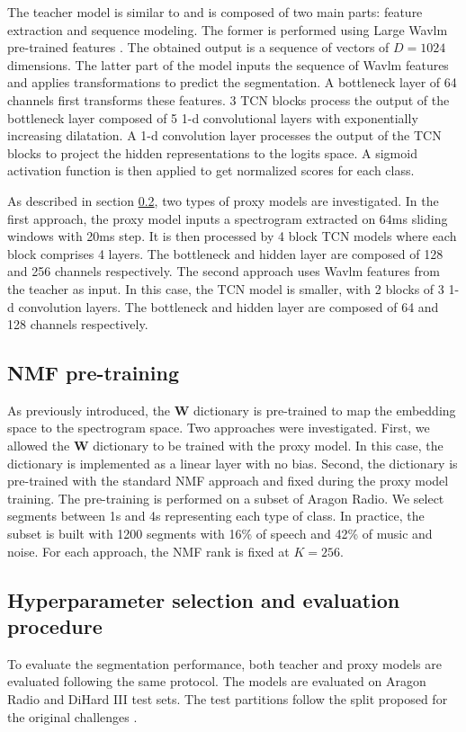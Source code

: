 The teacher model is similar to \cite{lebourdais22_interspeech} and is composed of two main parts: feature extraction and sequence modeling.
The former is performed using Large Wavlm pre-trained features \cite{chen2022wavlm}.
The obtained output is a sequence of vectors of $D=1024$ dimensions.
The latter part of the model inputs the sequence of Wavlm features and applies transformations to predict the segmentation.
A bottleneck layer of 64 channels first transforms these features.
3 TCN blocks process the output of the bottleneck layer \cite{bai_empirical_2018} composed of 5 1-d convolutional layers with exponentially increasing dilatation. 
A 1-d convolution layer processes the output of the TCN blocks to project the hidden representations to the logits space.
A sigmoid activation function is then applied to get normalized scores for each class.

As described in section \ref{}, two types of proxy models are investigated.
In the first approach, the proxy model inputs a spectrogram extracted on 64ms sliding windows with 20ms step.
It is then processed by 4 block TCN models where each block comprises 4 layers.
The bottleneck and hidden layer are composed of 128 and 256 channels respectively.
The second approach uses Wavlm features from the teacher as input.
In this case, the TCN model is smaller, with 2 blocks of 3 1-d convolution layers. 
The bottleneck and hidden layer are composed of 64 and 128 channels respectively.

\subsection{NMF pre-training}

As previously introduced, the $\mathbf{W}$ dictionary is pre-trained to map the embedding space to the spectrogram space.
Two approaches were investigated.
First, we allowed the $\mathbf{W}$ dictionary to be trained with the proxy model.
In this case, the dictionary is implemented as a linear layer with no bias.
Second, the dictionary is pre-trained with the standard NMF approach and fixed during the proxy model training.
The pre-training is performed on a subset of Aragon Radio.
We select segments between 1s and 4s representing each type of class.
In practice, the subset is built with 1200 segments with 16\% of speech and 42\% of music and noise.
For each approach, the NMF rank is fixed at $K=256$.


\subsection{Hyperparameter selection and evaluation procedure}

To evaluate the segmentation performance, both teacher and proxy models are evaluated following the same protocol.
The models are evaluated on Aragon Radio and DiHard III test sets.
The test partitions follow the split proposed for the original challenges \cite{albayzin12,ryant2021dihard}.
